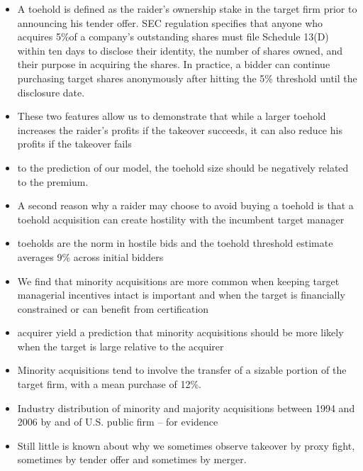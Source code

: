 \documentclass[12pt]{article}
\begin{document}
\begin{itemize}
        \item A toehold is defined as the raider’s ownership stake in the target firm prior to announcing his tender offer. SEC regulation specifies that anyone who acquires 5\%of a company’s outstanding shares must file Schedule 13(D) within ten days to disclose their identity, the number of shares owned, and their purpose in acquiring the shares. In practice, a bidder can continue purchasing target shares anonymously after hitting the 5\% threshold until the disclosure date. \citep{Goldman2005}

        \item These two features allow us to demonstrate that while a larger toehold increases the raider’s profits if the takeover succeeds, it can also reduce his profits if the takeover fails \citep{Goldman2005}

        \item to the prediction of our model, the toehold size should be negatively related to the premium. \citep{Goldman2005}

        \item A second reason why a raider may choose to avoid buying a toehold is that a toehold acquisition can create hostility with the incumbent target manager \citep{Goldman2005}

        \item toeholds are the norm in hostile bids and the toehold threshold estimate averages 9\% across initial bidders \citep{Betton2009}
 
        \item We find that minority acquisitions are more common when keeping target managerial incentives intact is important and when the target is financially constrained or can benefit from certification \citep{Ouimet2013}

        \item acquirer yield a prediction that minority acquisitions should be more likely when the target is large relative to the acquirer \citep{Ouimet2013}

        \item Minority acquisitions tend to involve the transfer of a sizable portion of the target firm, with a mean purchase of 12\%. \citep{Ouimet2013}

        \item Industry distribution of minority and majority acquisitions between 1994 and 2006 by and of U.S. public firm \citep{Ouimet2013} -- for evidence

        \item Still little is known about why we sometimes observe takeover by proxy fight, sometimes by tender offer and sometimes by merger. \citep{Harris1988}

    \end{itemize}
\end{document}
